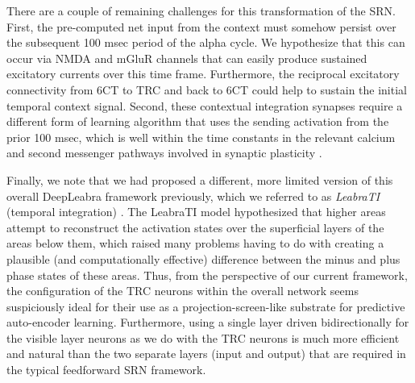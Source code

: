 \documentclass[11pt,twoside]{article}
\newif\myifpdf
\begin{document}
There are a couple of remaining challenges for this transformation of the SRN.  First, the pre-computed net input from the context must somehow persist over the subsequent 100 msec period of the alpha cycle.  We hypothesize that this can occur via NMDA and mGluR channels that can easily produce sustained excitatory currents over this time frame.  Furthermore, the reciprocal excitatory connectivity from 6CT to TRC and back to 6CT could help to sustain the initial temporal context signal.  Second, these contextual integration synapses require a different form of learning algorithm that uses the sending activation from the prior 100 msec, which is well within the time constants in the relevant calcium and second messenger pathways involved in synaptic plasticity \cite{UrakuboHondaFroemkeEtAl08,BearMalenka94}.

Finally, we note that we had proposed a different, more limited version of this overall DeepLeabra framework previously, which we referred to as {\em LeabraTI} (temporal integration) \cite{KachergisWyatteOReillyEtAl14}.  The LeabraTI model hypothesized that higher areas attempt to reconstruct the activation states over the superficial layers of the areas below them, which raised many problems having to do with creating a plausible (and computationally effective) difference between the minus and plus phase states of these areas.  Thus, from the perspective of our current framework, the configuration of the TRC neurons within the overall network seems suspiciously ideal for their use as a projection-screen-like substrate for predictive auto-encoder learning.  Furthermore, using a single layer driven bidirectionally for the visible layer neurons as we do with the TRC neurons is much more efficient and natural than the two separate layers (input and output) that are required in the typical feedforward SRN framework.


\end{document}

